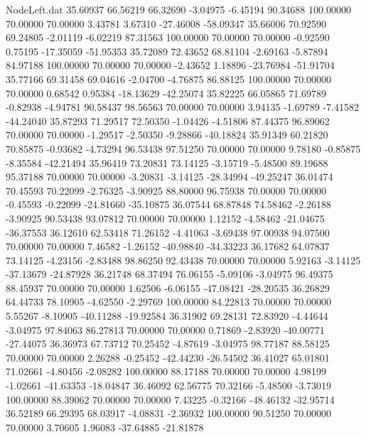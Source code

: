 \begin{filecontents}{NodeLeft.dat}
  35.60937   66.56219   66.32690    -3.04975   -6.45194   90.34688  100.00000   70.00000   70.00000    3.43781    3.67310  -27.46008  -58.09347
  35.66006   70.92590   69.24805    -2.01119   -6.02219   87.31563  100.00000   70.00000   70.00000   -0.92590    0.75195  -17.35059  -51.95353
  35.72089   72.43652   68.81104    -2.69163   -5.87894   84.97188  100.00000   70.00000   70.00000   -2.43652    1.18896  -23.76984  -51.91704
  35.77166   69.31458   69.04616    -2.04700   -4.76875   86.88125  100.00000   70.00000   70.00000    0.68542    0.95384  -18.13629  -42.25074
  35.82225   66.05865   71.69789    -0.82938   -4.94781   90.58437   98.56563   70.00000   70.00000    3.94135   -1.69789   -7.41582  -44.24040
  35.87293   71.29517   72.50350    -1.04426   -4.51806   87.44375   96.89062   70.00000   70.00000   -1.29517   -2.50350   -9.28866  -40.18824
  35.91349   60.21820   70.85875    -0.93682   -4.73294   96.53438   97.51250   70.00000   70.00000    9.78180   -0.85875   -8.35584  -42.21494
  35.96419   73.20831   73.14125    -3.15719   -5.48500   89.19688   95.37188   70.00000   70.00000   -3.20831   -3.14125  -28.34994  -49.25247
  36.01474   70.45593   70.22099    -2.76325   -3.90925   88.80000   96.75938   70.00000   70.00000   -0.45593   -0.22099  -24.81660  -35.10875
  36.07544   68.87848   74.58462    -2.26188   -3.90925   90.53438   93.07812   70.00000   70.00000    1.12152   -4.58462  -21.04675  -36.37553
  36.12610   62.53418   71.26152    -4.41063   -3.69438   97.00938   94.07500   70.00000   70.00000    7.46582   -1.26152  -40.98840  -34.33223
  36.17682   64.07837   73.14125    -4.23156   -2.83488   98.86250   92.43438   70.00000   70.00000    5.92163   -3.14125  -37.13679  -24.87928
  36.21748   68.37494   76.06155    -5.09106   -3.04975   96.49375   88.45937   70.00000   70.00000    1.62506   -6.06155  -47.08421  -28.20535
  36.26829   64.44733   78.10905    -4.62550   -2.29769  100.00000   84.22813   70.00000   70.00000    5.55267   -8.10905  -40.11288  -19.92584
  36.31902   69.28131   72.83920    -4.44644   -3.04975   97.84063   86.27813   70.00000   70.00000    0.71869   -2.83920  -40.00771  -27.44075
  36.36973   67.73712   70.25452    -4.87619   -3.04975   98.77187   88.58125   70.00000   70.00000    2.26288   -0.25452  -42.44230  -26.54502
  36.41027   65.01801   71.02661    -4.80456   -2.08282  100.00000   88.17188   70.00000   70.00000    4.98199   -1.02661  -41.63353  -18.04847
  36.46092   62.56775   70.32166    -5.48500   -3.73019  100.00000   88.39062   70.00000   70.00000    7.43225   -0.32166  -48.46132  -32.95714
  36.52189   66.29395   68.03917    -4.08831   -2.36932  100.00000   90.51250   70.00000   70.00000    3.70605    1.96083  -37.64885  -21.81878

\end{filecontents}
